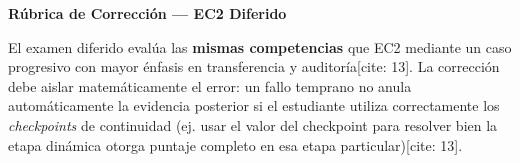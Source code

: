 \documentclass[11pt, a4paper, landscape]{article}
\begin{document}
\begin{center}
    \Large\textbf{\textcolor{ucbblue}{Rúbrica de Corrección — EC2 Diferido}}\\[0.2cm]
\end{center}

\begin{tcolorbox}[colback=white, colframe=black, title=\textbf{Principio General de Calificación Diferida}, left=1mm, right=1mm, top=1mm, bottom=1mm]
    \small
    El examen diferido evalúa las \textbf{mismas competencias} que EC2 mediante un caso progresivo con mayor énfasis en transferencia y auditoría[cite: 13]. La corrección debe aislar matemáticamente el error: un fallo temprano no anula automáticamente la evidencia posterior si el estudiante utiliza correctamente los \textit{checkpoints} de continuidad (ej. usar el valor del checkpoint para resolver bien la etapa dinámica otorga puntaje completo en esa etapa particular)[cite: 13].
\end{tcolorbox}
\end{document}
